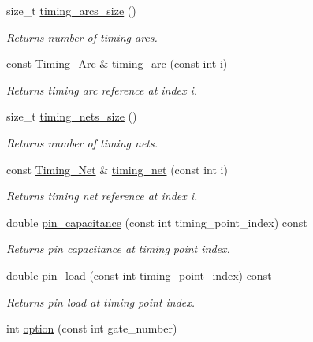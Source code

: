 \begin{DoxyCompactItemize}
size\-\_\-t \hyperlink{classTiming__Analysis_1_1Timing__Analysis_a239195867157ea06264afcdc3bb54e53}{timing\-\_\-arcs\-\_\-size} ()
\begin{DoxyCompactList}\small\item\em Returns number of timing arcs. \end{DoxyCompactList}\item 
const \hyperlink{classTiming__Analysis_1_1Timing__Arc}{Timing\-\_\-\-Arc} \& \hyperlink{classTiming__Analysis_1_1Timing__Analysis_ab51fd160e68b13a059efdcc460da1e83}{timing\-\_\-arc} (const int i)
\begin{DoxyCompactList}\small\item\em Returns timing arc reference at index i. \end{DoxyCompactList}\item 
size\-\_\-t \hyperlink{classTiming__Analysis_1_1Timing__Analysis_a0d0a28110de2017c754373f7a73c160d}{timing\-\_\-nets\-\_\-size} ()
\begin{DoxyCompactList}\small\item\em Returns number of timing nets. \end{DoxyCompactList}\item 
const \hyperlink{classTiming__Analysis_1_1Timing__Net}{Timing\-\_\-\-Net} \& \hyperlink{classTiming__Analysis_1_1Timing__Analysis_ab113f7930936110307c215a90e410769}{timing\-\_\-net} (const int i)
\begin{DoxyCompactList}\small\item\em Returns timing net reference at index i. \end{DoxyCompactList}\item 
double \hyperlink{classTiming__Analysis_1_1Timing__Analysis_a0263a18b53ef152589a3396423490f78}{pin\-\_\-capacitance} (const int timing\-\_\-point\-\_\-index) const 
\begin{DoxyCompactList}\small\item\em Returns pin capacitance at timing point index. \end{DoxyCompactList}\item 
double \hyperlink{classTiming__Analysis_1_1Timing__Analysis_a6569529b1614d4507d48293c7ea9f544}{pin\-\_\-load} (const int timing\-\_\-point\-\_\-index) const 
\begin{DoxyCompactList}\small\item\em Returns pin load at timing point index. \end{DoxyCompactList}\item 
int \hyperlink{classTiming__Analysis_1_1Timing__Analysis_a578a7940a493f7e6ab5ca4518984b8d4}{option} (const int gate\-\_\-number)

\end{DoxyCompactItemize}
